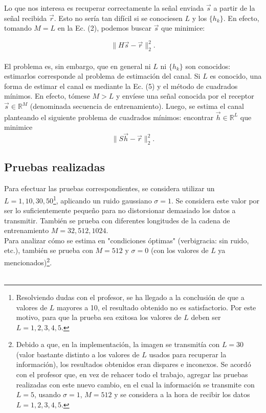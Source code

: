 \documentclass[10pt,journal,compsoc]{IEEEtran}
\begin{document}
Lo que nos interesa es recuperar correctamente la se\~nal enviada $\vec{s}$ a partir de la se\~nal recibida $\vec{r}$. Esto no ser\'ia tan dif\'icil si se conociesen $L$ y los $\{{h_{k}\}}$. En
efecto, tomando $M = L$ en la Ec. (2), podemos buscar $\vec{s}$ que minimice:

\begin{equation}
\| H\vec{s}-\vec{r}\|_{2}^{2}  .
\end{equation}
\\

El problema es, sin embargo, que en general ni $L$ ni $\{{h_{k}\}}$ son conocidos: estimarlos
corresponde al problema de estimaci\'on del canal.
Si $L$ es conocido, una forma de estimar el canal es mediante la Ec. (5) y el
m\'etodo de cuadrados m\'inimos. En efecto, t\'omese $M > L$ y env\'iese una se\~nal
conocida por el receptor $\vec{s} \in \mathbb{R}^{M} $ (denominada secuencia de entrenamiento).
Luego, se estima el canal planteando el siguiente problema de cuadrados m\'inimos:
encontrar $\vec{h} \in \mathbb{R}^{L} $ que minimice
\begin{equation}
\| S\vec{h}-\vec{r}\|_{2}^{2}  .
\end{equation}

\subsection{Pruebas realizadas}
Para efectuar las pruebas correspondientes, se considera utilizar un $L={1,10,30,50}$\footnote[1]{Resolviendo dudas con el profesor, se ha llegado a la conclusi\'on de que a valores de $L$ mayores a 10, el resultado obtenido no es satisfactorio. Por este motivo, para que la prueba sea exitosa los valores de $L$ deben ser $L={1, 2, 3, 4, 5}$.}, aplicando un ruido gaussiano $\sigma=1$. Se considera este valor por ser lo suficientemente peque\~no para no distorsionar demasiado los datos a transmitir. Tambi\'en se prueba con diferentes longitudes de la cadena de entrenamiento $M={32,512,1024}$. \\  Para analizar c\'omo se estima en "condiciones \'optimas" (verbigracia: sin ruido, etc.), tambi\'en se prueba con $M=512$ y $\sigma=0$ (con los valores de $L$ ya mencionados)\footnote[2]{Debido a que, en la implementaci\'on, la imagen se transmit\'ia con $L=30$ (valor bastante distinto a los valores de $L$ usados para recuperar la informaci\'on), los resultados obtenidos eran dispares e inconexos. Se acord\'o con el profesor que, en vez de rehacer todo el trabajo, agregar las pruebas realizadas con este nuevo cambio, en el cual la informaci\'on se transmite con $L=5$, usando $\sigma=1$, $M=512$ y se considera a la hora de recibir los datos $L={1, 2, 3, 4, 5}$.}.\\
\\
\end{document}
